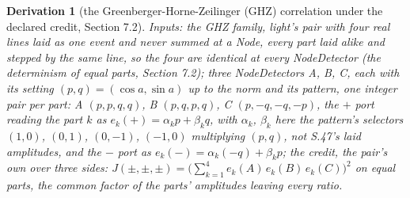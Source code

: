 \documentclass[pdflatex,sn-mathphys-num]{sn-jnl}
\theoremstyle{thmstyleone}
\newtheorem{derivation}{Derivation}
\begin{document}
\begin{derivation}[the Greenberger-Horne-Zeilinger (GHZ) correlation under the declared credit, Section 7.2]
\emph{Inputs:} the GHZ family, light's pair with four real lines laid as one event and never summed at a Node, every part laid alike and stepped by the same line, so the four are identical at every NodeDetector (the determinism of equal parts, Section 7.2); three NodeDetectors A, B, C, each with its setting $(p, q) = (\cos a, \sin a)$ up to the norm and its pattern, one integer pair per part: A $(p, p, q, q)$, B $(p, q, p, q)$, C $(p, -q, -q, -p)$, the $+$ port reading the part $k$ as $e_k(+) = \alpha_k p + \beta_k q$, with $\alpha_k$, $\beta_k$ here the pattern's selectors $(1, 0)$, $(0, 1)$, $(0, -1)$, $(-1, 0)$ multiplying $(p, q)$, not S.47's laid amplitudes, and the $-$ port as $e_k(-) = \alpha_k(-q) + \beta_k p$; the credit, the pair's own over three sides: $J(\pm, \pm, \pm) = \bigl(\sum_{k=1}^4 e_k(A)\,e_k(B)\,e_k(C)\bigr)^2$ on equal parts, the common factor of the parts' amplitudes leaving every ratio.

\end{derivation}
\end{document}
